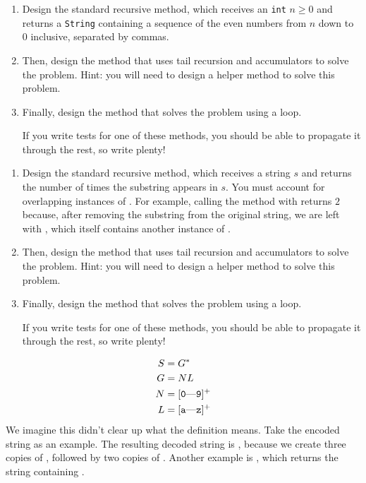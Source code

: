 \begin{enumerate}[label=(\alph*)]
\item Design the standard recursive  method, which receives an \texttt{int} $n \geq 0$ and returns a \texttt{String} containing a sequence of the even numbers from $n$ down to $0$ inclusive, separated by commas.

\item Then, design the  method that uses tail recursion and accumulators to solve the problem. Hint: you will need to design a  helper method to solve this problem.

\item Finally, design the  method that solves the problem using a loop.

If you write tests for one of these methods, you should be able to propagate it through the rest, so write plenty!
\end{enumerate}

\begin{enumerate}[label=(\alph*)]
    \item Design the standard recursive  method, which receives a string $s$ and returns the number of times the substring  appears in $s$. You must account for overlapping instances of . For example, calling the method with  returns $2$ because, after removing the substring  from the original string, we are left with , which itself contains another instance of .

    \item Then, design the  method that uses tail recursion and accumulators to solve the problem. Hint: you will need to design a  helper method to solve this problem.

    \item Finally, design the  method that solves the problem using a loop.

    If you write tests for one of these methods, you should be able to propagate it through the rest, so write plenty!
\end{enumerate}

\begin{align*}
S &= G^{*}\\
G &= NL\\
N &= [\text{\ttt{0}---\ttt{9}}]^{+}\\
L &= [\text{\ttt{a}---\ttt{z}}]^{+}
\end{align*}
We imagine this didn't clear up what the definition means. Take the encoded string  as an example. The resulting decoded string is , because we create three copies of , followed by two copies of . Another example is , which returns the string containing .

